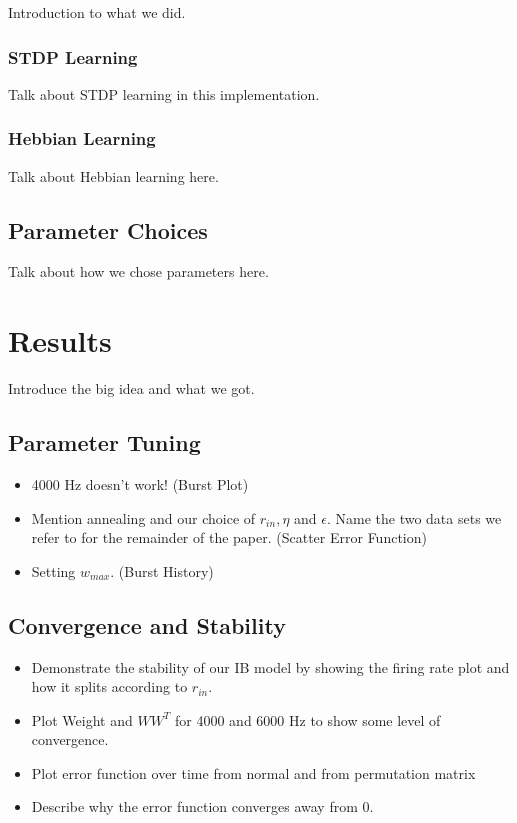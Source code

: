 \documentclass[12pt, draft]{article}
\begin{document}
Introduction to what we did.

\subsubsection{STDP Learning}

Talk about STDP learning in this implementation.

\subsubsection{Hebbian Learning}

Talk about Hebbian learning here.

\subsection{Parameter Choices}

Talk about how we chose parameters here.

\section{Results}

Introduce the big idea and what we got.

\subsection{Parameter Tuning}

\begin{itemize}
\item 4000 Hz doesn't work! (Burst Plot)

\item Mention annealing and our choice of \(r_{in}, \eta\) and \(\epsilon\). Name the two data sets we refer to for the remainder of the paper. (Scatter Error Function)

\item Setting \(w_{max}\). (Burst History)
\end{itemize}

\subsection{Convergence and Stability}

\begin{itemize}
\item Demonstrate the stability of our IB model by showing the firing rate plot and how it splits according to \(r_{in}\).

\item Plot Weight and \(WW^T\) for 4000 and 6000 Hz to show some level of convergence.

\item Plot error function over time from normal and from permutation matrix

\item Describe why the error function converges away from 0.
\end{itemize}
\end{document}
